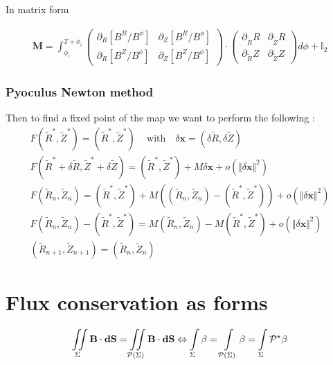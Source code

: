 In matrix form

\begin{align}
    \textbf{M} = \int_{\phi_i}^{T+\phi_i}\begin{pmatrix}
        \partial_{R}\left[B^R/B^\phi\right] & \partial_{Z}\left[B^R/B^\phi\right]\\
        \partial_{R}\left[B^Z/B^\phi\right] & \partial_{Z}\left[B^Z/B^\phi\right]
    \end{pmatrix}\cdot\begin{pmatrix}
        \partial_{\tilde{R}}R & \partial_{\tilde{Z}}R\\
        \partial_{\tilde{R}}Z & \partial_{\tilde{Z}}Z
    \end{pmatrix}d\phi + \mathbb{I}_2
\end{align}

\subsection{Pyoculus Newton method}

Then to find a fixed point of the map we want to perform the following :
\begin{align*}
    F(\tilde{R}^*, \tilde{Z}^*) = (\tilde{R}^*, \tilde{Z}^*)\,\quad\text{with}\quad \delta\textbf{x}=(\delta \tilde{R}, \delta \tilde{Z})\\
    F(\tilde{R}^*+\delta \tilde{R}, \tilde{Z}^*+\delta \tilde{Z}) = (\tilde{R}^*, \tilde{Z}^*) + M\delta\textbf{x}+ o(\Vert \delta\textbf{x}\Vert^2)\\
    F(\tilde{R}_n,\tilde{Z}_n) = (\tilde{R}^*, \tilde{Z}^*) + M((\tilde{R}_n,\tilde{Z}_n) - (\tilde{R}^*, \tilde{Z}^*))+ o(\Vert \delta\textbf{x}\Vert^2)\\
    F(\tilde{R}_n,\tilde{Z}_n) - (\tilde{R}^*, \tilde{Z}^*)  = M(\tilde{R}_n,\tilde{Z}_n) - M(\tilde{R}^*, \tilde{Z}^*)+ o(\Vert \delta\textbf{x}\Vert^2)\\
    (\tilde{R}_{n+1},\tilde{Z}_{n+1}) = (\tilde{R}_n,\tilde{Z}_n)
\end{align*}


\chapter{Flux conservation as forms}\label{forms}

\begin{equation*}
    \iint\limits_{\Sigma}\textbf{B}\cdot\textbf{dS} = \iint\limits_{\mathcal{P}(\Sigma)}\textbf{B}\cdot\textbf{dS} \Leftrightarrow \int\limits_{\Sigma}\beta = \int\limits_{\mathcal{P}(\Sigma)}\beta = \int\limits_{\Sigma}\mathcal{P}^\star\beta
\end{equation*}

